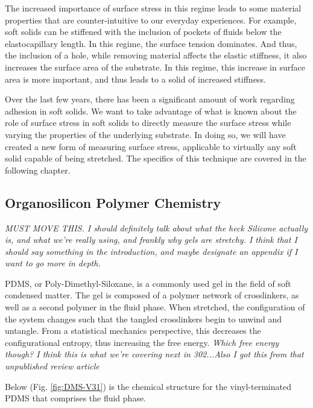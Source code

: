 The increased importance of surface stress in this regime leads to some material properties that are counter-intuitive to our everyday experiences. For example, soft solids can be stiffened with the inclusion of pockets of fluids below the elastocapillary length. In this regime, the surface tension dominates. And thus, the inclusion of a hole, while removing material affects the elastic stiffness, it also increases the surface area of the substrate. In this regime, this increase in surface area is more important, and thus leads to a solid of increased stiffness.

Over the last few years, there has been a significant amount of work regarding adhesion in soft solids. We want to take advantage of what is known about the role of surface stress in soft solids to directly measure the surface stress while varying the properties of the underlying substrate. In doing so, we will have created a new form of measuring surface stress, applicable to virtually any soft solid capable of being stretched. The specifics of this technique are covered in the following chapter.

\subsection{Organosilicon Polymer Chemistry}
\emph{MUST MOVE THIS. I should definitely talk about what the heck Silicone actually is, and what we're really using, and frankly why gels are stretchy. I think that I should say something in the introduction, and maybe designate an appendix if I want to go more in depth.} 

PDMS, or Poly-Dimethyl-Siloxane, is a commonly used gel in the field of soft condensed matter. The gel is composed of a polymer network of crosslinkers, as well as a second polymer in the fluid phase. When stretched, the configuration of the system changes such that the tangled crosslinkers begin to unwind and untangle. From a statistical mechanics perspective, this decreases the configurational entropy, thus increasing the free energy. \emph{Which free energy though? I think this is what we're covering next in 302...Also I got this from that unpublished review article}

Below (Fig. \ref{fig:DMS-V31}) is the chemical structure for the vinyl-terminated PDMS that comprises the fluid phase.
\setatomsep{20pt}

\newcommand\setpolymerdelim[2]{\def\delimleft{#1}\def\delimright{#2}}
\def\makebraces(#1,#2)#3#4#5{%
	\edef\delimhalfdim{\the\dimexpr(#1+#2)/2}%
	\edef\delimvshift{\the\dimexpr(#1-#2)/2}%
	\chemmove{
		\node[at=(#4),yshift=(\delimvshift)]
		{$
			\left\delimleft
			\vrule height\delimhalfdim depth\delimhalfdim width0pt
			\right.
			$};
		\node[at=(#5),yshift=(\delimvshift)]
		{$
			\left.
			\vrule height\delimhalfdim depth\delimhalfdim width0pt
			\right\delimright_{\rlap{#3}}
			$};
	}%
}

